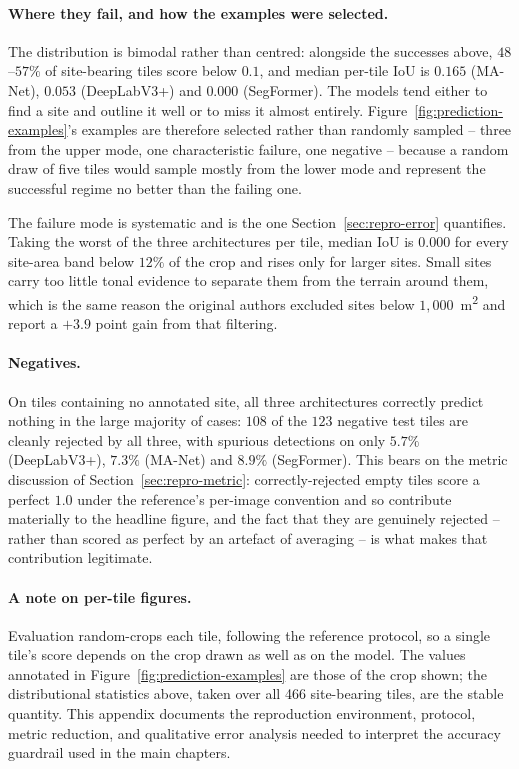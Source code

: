 \paragraph{Where they fail, and how the examples were selected.}
The distribution is bimodal rather than centred: alongside the successes above,
$48$--$57\%$ of site-bearing tiles score below $0.1$, and median per-tile IoU is
$0.165$ (MA-Net), $0.053$ (DeepLabV3+) and $0.000$ (SegFormer). The models tend
either to find a site and outline it well or to miss it almost entirely.
Figure~\ref{fig:prediction-examples}'s examples are therefore selected rather
than randomly sampled -- three from the upper mode, one characteristic failure,
one negative -- because a random draw of five tiles would sample mostly from the
lower mode and represent the successful regime no better than the failing one.

The failure mode is systematic and is the one Section~\ref{sec:repro-error}
quantifies. Taking the worst of the three architectures per tile, median IoU is
$0.000$ for every site-area band below $12\%$ of the crop and rises only for
larger sites. Small sites carry too little tonal evidence to separate them from
the terrain around them, which is the same reason the original authors excluded
sites below $1{,}000$~m\textsuperscript{2} and report a $+3.9$ point gain from
that filtering.

\paragraph{Negatives.}
On tiles containing no annotated site, all three architectures correctly predict
nothing in the large majority of cases: $108$ of the $123$ negative test tiles
are cleanly rejected by all three, with spurious detections on only $5.7\%$
(DeepLabV3+), $7.3\%$ (MA-Net) and $8.9\%$ (SegFormer). This bears on the metric
discussion of Section~\ref{sec:repro-metric}: correctly-rejected empty tiles
score a perfect $1.0$ under the reference's per-image convention and so
contribute materially to the headline figure, and the fact that they are
genuinely rejected -- rather than scored as perfect by an artefact of averaging
-- is what makes that contribution legitimate.

\paragraph{A note on per-tile figures.}
Evaluation random-crops each tile, following the reference protocol, so a single
tile's score depends on the crop drawn as well as on the model. The values
annotated in Figure~\ref{fig:prediction-examples} are those of the crop shown;
the distributional statistics above, taken over all 466 site-bearing tiles, are
the stable quantity.
This appendix documents the reproduction environment, protocol, metric reduction,
and qualitative error analysis needed to interpret the accuracy guardrail used in
the main chapters.
